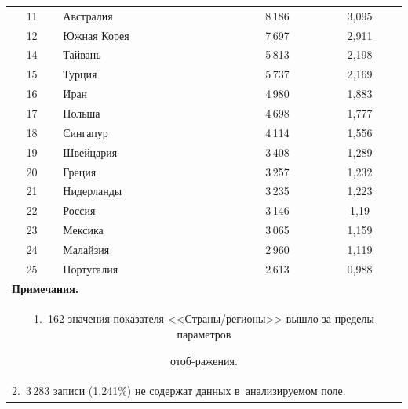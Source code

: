 \begin{table}
\begin{center}
\begin{tabular}{|c|l|c|c|}
11&Австралия&\hphantom{9}8\,186&3,095\\


12&Южная Корея&\hphantom{9}7\,697&2,911\\


14&Тайвань&\hphantom{9}5\,813&2,198\\


15&Турция&\hphantom{9}5\,737&2,169\\


16&Иран&\hphantom{9}4\,980&1,883\\


17&Польша&\hphantom{9}4\,698&1,777\\


18&Сингапур&\hphantom{9}4\,114&1,556\\


19&Швейцария&\hphantom{9}3\,408&1,289\\


20&Греция&\hphantom{9}3\,257&1,232\\


21&Нидерланды&\hphantom{9}3\,235&1,223\\


22&Россия &\hphantom{9}3\,146&1,19\hphantom{9}\\


23&Мексика&\hphantom{9}3\,065&1,159\\


24&Малайзия&\hphantom{9}2\,960&1,119\\


25&Португалия&\hphantom{9}2\,613&0,988\\


\hline


\multicolumn{4}{l}{\footnotesize


\hspace*{5mm}\textbf{Примечания.}}\\


\multicolumn{4}{p{320pt}}{\footnotesize


1.~162 значения показателя <<Страны\!/\!регионы>> вышло за пределы параметров 


отоб-\linebreak \hphantom{1.~}ражения.}\\


\multicolumn{4}{l}{\footnotesize


2.~3\,283 записи (1,241\%) не содержат данных в~анализируемом поле.}\\


\end{tabular}


\end{center}


\vspace*{-10pt}


\end{table}





